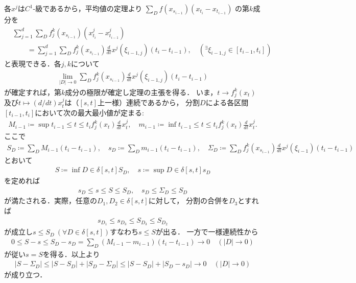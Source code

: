 	\begin{prf}
		各$x^j$は$C^1$-級であるから，平均値の定理より
		$\sum_{D} f(x_{s_{i-1}})(x_{t_i} - x_{t_{i-1}})$
		の第$k$成分を
		\begin{align}
			&\sum_{j=1}^{d} \sum_{D} f^k_j (x_{s_{i-1}})(x^j_{t_i} - x^j_{t_{i-1}}) 
				\label{eq:thm_existence_of_Riemann_Stieltjes_integral}\\
			&\qquad 
			= \sum_{j=1}^{d} \sum_{D} f^k_j (x_{s_{i-1}}) \tfrac{d}{dt}x^j(\xi_{i-1,j})(t_i - t_{i-1}),
			\quad ({}^\exists \xi_{i-1,j} \in [t_{i-1},t_i])
		\end{align}
		と表現できる．各$j,k$について
		\begin{align}
			\lim_{|D| \to 0} \sum_{D} f^k_j (x_{s_{i-1}}) \tfrac{d}{dt}x^j(\xi_{i-1,j})(t_i - t_{i-1})
		\end{align}
		が確定すれば，第$k$成分の極限が確定し定理の主張を得る．
		いま，$t \longrightarrow f^k_j(x_t)$及び$t \longmapsto (d/dt)x^j_t$は（$[s,t]$上一様）連続であるから，
		分割$D$による各区間$[t_{i-1},t_i]$において次の最大最小値が定まる:
		\begin{align}
			M_{i-1} \coloneqq \sup{t_{i-1} \leq t \leq t_i} f^k_j(x_t)\tfrac{d}{dt}x^j_t,
			\quad m_{i-1} \coloneqq \inf{t_{i-1} \leq t \leq t_i} f^k_j(x_t)\tfrac{d}{dt}x^j_t.
		\end{align}
		ここで
		\begin{align}
			S_D \coloneqq \sum_{D} M_{i-1}(t_i - t_{i-1}),
			\quad s_D \coloneqq \sum_{D} m_{i-1}(t_i - t_{i-1}),
			\quad \Sigma_D \coloneqq \sum_{D} f^k_j (x_{s_{i-1}}) \tfrac{d}{dt}x^j(\xi_{i-1})(t_i - t_{i-1})
		\end{align}
		とおいて
		\begin{align}
			S \coloneqq \inf{D \in \delta[s,t]}{S_D},
			\quad s \coloneqq \sup{D \in \delta[s,t]}{s_D}
		\end{align}
		を定めれば
		\begin{align}
			s_D \leq s \leq S \leq S_D,
			\quad s_D \leq \Sigma_D \leq S_D
		\end{align}
		が満たされる．実際，任意の$D_1,D_2 \in \delta[s,t]$に対して，
		分割の合併を$D_3$とすれば
		\begin{align}
			s_{D_1} \leq s_{D_3} \leq S_{D_3} \leq S_{D_2}
		\end{align}
		が成立し$s \leq S_D\ (\forall D \in \delta[s,t])$すなわち$s \leq S$が出る．
		一方で一様連続性から
		\begin{align}
			0 \leq S - s \leq S_D - s_D = \sum_D (M_{i-1} - m_{i-1})(t_i - t_{i-1})
			\longrightarrow 0
			\quad (|D| \longrightarrow 0)
		\end{align}
		が従い$s = S$を得る．以上より
		\begin{align}
			|S - \Sigma_D| \leq |S - S_D| + |S_D - \Sigma_D|
			\leq |S - S_D| + |S_D - s_D|
			\longrightarrow 0
			\quad (|D| \longrightarrow 0)
		\end{align}
		が成り立つ．
		\QED
\end{prf}

